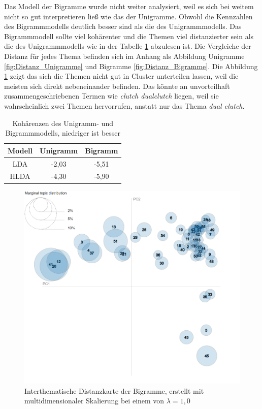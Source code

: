Das Modell der Bigramme wurde nicht weiter analysiert, weil es sich bei weitem nicht so gut interpretieren ließ wie das der Unigramme. Obwohl die Kennzahlen des Bigrammmodells deutlich besser sind als die des Unigrammmodells. Das Bigrammmodell sollte viel kohärenter und die Themen viel distanzierter sein als die des Unigrammmodells wie in der Tabelle \ref{table:Kohärenzen} abzulesen ist. Die Vergleiche der Distanz für jedes Thema befinden sich im Anhang als Abbildung Unigramme \ref{fig:Distanz_Unigramme} und Bigramme \ref{fig:Distanz_Bigramme}. Die Abbildung \ref{fig:MDS_Bigramme} zeigt das sich die Themen nicht gut in Cluster unterteilen lassen, weil die meisten sich direkt nebeneinander befinden. Das könnte an unvorteilhaft zusammengeschriebenen Termen wie \emph{clutch dualclutch} liegen, weil sie wahrscheinlich zwei Themen hervorrufen, anstatt nur das Thema \emph{dual clutch}.

\begin{table}
	\RawFloats
	\centering
	\caption{Kohärenzen des Unigramm- und Bigrammmodells, niedriger ist besser}
	\begin{tabular}{|c|c|c|}
		\hline
		Modell & Unigramm & Bigramm \\
		\hline
		LDA & -2,03 & -5,51 \\
		\hline
		HLDA & -4,30 & -5,90 \\
		\hline
	\end{tabular}
	\label{table:Kohärenzen}
\end{table} 

\begin{figure}[htpb]
	\centering
	\includegraphics[width=\textwidth,keepaspectratio=true]{img/LDAvisGM-3-2-5blank.png}
	\caption{
		Interthematische Distanzkarte der Bigramme, erstellt mit multidimensionaler Skalierung bei einem von $\lambda = 1,0$
	}
	\label{fig:MDS_Bigramme}
\end{figure}

